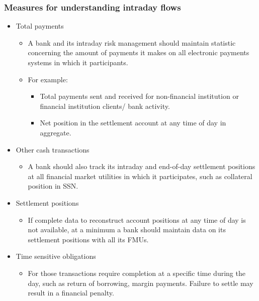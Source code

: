 \subsubsection{Measures for understanding intraday flows}
\begin{itemize}
\item Total payments
    \begin{itemize}
    \item A bank and its intraday risk management should maintain statistic concerning the amount of payments it makes on all electronic payments systems in which it participants.
    \item For example:
        \begin{itemize}
        \item Total payments sent and received for non-financial institution or financial institution clients/ bank activity.
        \item Net position in the settlement account at any time of day in aggregate.
        \end{itemize}
        
    \end{itemize}
    
\item Other cash transactions
    \begin{itemize}
    \item A bank should also track its intraday and end-of-day settlement positions at all financial market utilities in which it participates, such as collateral position in SSN.
    \end{itemize}
    
\item Settlement positions
    \begin{itemize}
    \item If complete data to reconstruct account positions at any time of day is not available, at a minimum a bank should maintain data on its settlement positions with all its FMUs.
    \end{itemize}
    
\item Time sensitive obligations
    \begin{itemize}
    \item For those transactions require completion at a specific time during the day, such as return of borrowing, margin payments. Failure to settle may result in a financial penalty.
    \end{itemize}
    

\end{itemize}
